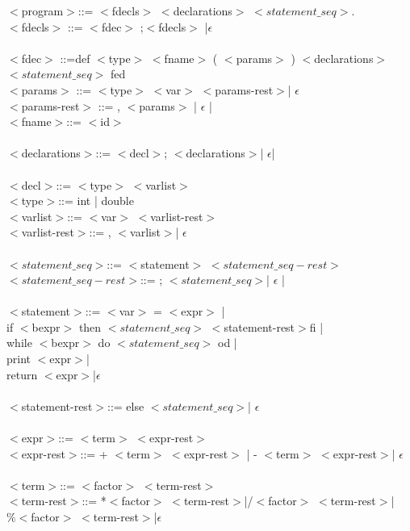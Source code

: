 \documentclass[fleqn]{article}
\begin{document}
$<$program$>$::= $<$fdecls$>$ $<$declarations$>$ $<statement\_ seq>$. \\ 
$<$fdecls$>$ ::=  $<$fdec$>$ ;$<$fdecls$>$ |$\epsilon$\\
\\
$<$fdec$>$ ::=def $<$type$>$ $<$fname$>$ ( $<$params$>$ ) $<$declarations$>$ $<statement\_ seq>$ fed\\
$<$params$>$ ::= $<$type$>$ $<$var$>$ $<$params-rest$>$| $\epsilon$ \\
$<$params-rest$>$ ::=  ,  $<$params$>$ | $\epsilon$ | \\
$<$fname$>$::= $<$id$>$\\
\\
$<$declarations$>$::= $<$decl$>$; $<$declarations$>$| $\epsilon$|\\
\\
$<$decl$>$::= $<$type$>$ $<$varlist$>$ \\ 
$<$type$>$::= int | double \\
$<$varlist$>$::= $<$var$>$ $<$varlist-rest$>$\\
$<$varlist-rest$>$::= , $<$varlist$>$| $\epsilon$ \\
\\
$<statement\_ seq>$::= $<$statement$>$ $<statement\_ seq-rest>$ \\
$<statement\_ seq-rest>$::=  ; $<statement\_ seq>$| $\epsilon$ |\\
\\
$<$statement$>$::= $<$var$>$ = $<$expr$>$ |\\ 
if $<$bexpr$>$ then $<statement\_ seq>$ $<$statement-rest$>$fi |\\ 
while $<$bexpr$>$ do $<statement\_ seq>$ od |\\ print $<$expr$>$|\\ return $<$expr$>$|$\epsilon$  \\
\\
$<$statement-rest$>$::=  else $<statement\_ seq>$| $\epsilon$\\
\\
$<$expr$>$::= $<$term$>$ $<$expr-rest$>$\\
$<$expr-rest$>$::=  + $<$term$>$ $<$expr-rest$>$ |  - $<$term$>$ $<$expr-rest$>$| $\epsilon$\\
\\
$<$term$>$::=  $<$factor$>$ $<$term-rest$>$\\
$<$term-rest$>$::= *$<$factor$>$ $<$term-rest$>$|/$<$factor$>$ $<$term-rest$>$|$\%<$factor$>$ $<$term-rest$>$|$\epsilon$\\
\end{document}
